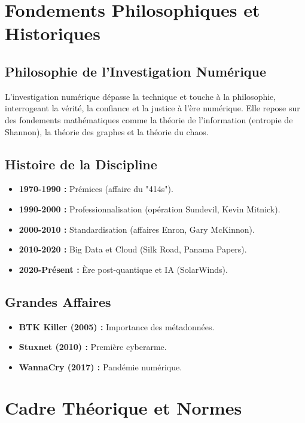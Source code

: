 \documentclass[12pt]{article}
\begin{document}
\section{Fondements Philosophiques et Historiques}

\subsection{Philosophie de l'Investigation Numérique}

L'investigation numérique dépasse la technique et touche à la philosophie, interrogeant la vérité, la confiance et la justice à l'ère numérique. Elle repose sur des fondements mathématiques comme la théorie de l'information (entropie de Shannon), la théorie des graphes et la théorie du chaos.

\subsection{Histoire de la Discipline}

\begin{itemize}
    \item \textbf{1970-1990 :} Prémices (affaire du "414s").
    \item \textbf{1990-2000 :} Professionnalisation (opération Sundevil, Kevin Mitnick).
    \item \textbf{2000-2010 :} Standardisation (affaires Enron, Gary McKinnon).
    \item \textbf{2010-2020 :} Big Data et Cloud (Silk Road, Panama Papers).
    \item \textbf{2020-Présent :} Ère post-quantique et IA (SolarWinds).
\end{itemize}

\subsection{Grandes Affaires}

\begin{itemize}
    \item \textbf{BTK Killer (2005) :} Importance des métadonnées.
    \item \textbf{Stuxnet (2010) :} Première cyberarme.
    \item \textbf{WannaCry (2017) :} Pandémie numérique.
\end{itemize}

\section{Cadre Théorique et Normes}
\end{document}
